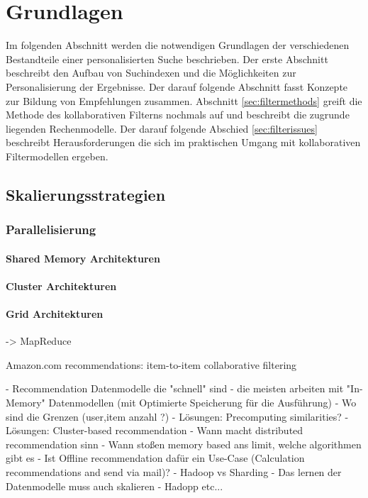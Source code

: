 \section{Grundlagen}

Im folgenden Abschnitt werden die notwendigen Grundlagen der verschiedenen Bestandteile einer personalisierten Suche beschrieben. Der erste Abschnitt beschreibt den Aufbau von Suchindexen und die Möglichkeiten zur Personalisierung der Ergebnisse. Der darauf folgende Abschnitt fasst Konzepte zur Bildung von Empfehlungen zusammen. Abschnitt \ref{sec:filtermethods} greift die Methode des kollaborativen Filterns nochmals auf und beschreibt die zugrunde liegenden Rechenmodelle. Der darauf folgende Abschied \ref{sec:filterissues} beschreibt Herausforderungen die sich im praktischen Umgang mit kollaborativen Filtermodellen ergeben. 








\subsection{Skalierungsstrategien}


\subsubsection{Parallelisierung}

\citep{Langford09}

\paragraph{Shared Memory Architekturen}
\paragraph{Cluster Architekturen}
\paragraph{Grid Architekturen} -> MapReduce



\citep{linden03} Amazon.com recommendations: item-to-item collaborative filtering

 - Recommendation Datenmodelle die "schnell" sind
- die meisten arbeiten mit "In-Memory" Datenmodellen (mit Optimierte Speicherung für die Ausführung)
        - Wo sind die Grenzen (user,item anzahl ?)
        - Lösungen: Precomputing similarities? 
  - Lösungen: Cluster-based recommendation
- Wann macht distributed recommendation sinn
  - Wann stoßen memory based ans limit, welche algorithmen gibt es
  - Ist Offline recommendation dafür ein Use-Case (Calculation recommendations and send via mail)?
  - Hadoop vs Sharding
  - Das lernen der Datenmodelle muss auch skalieren
- Hadopp etc...


